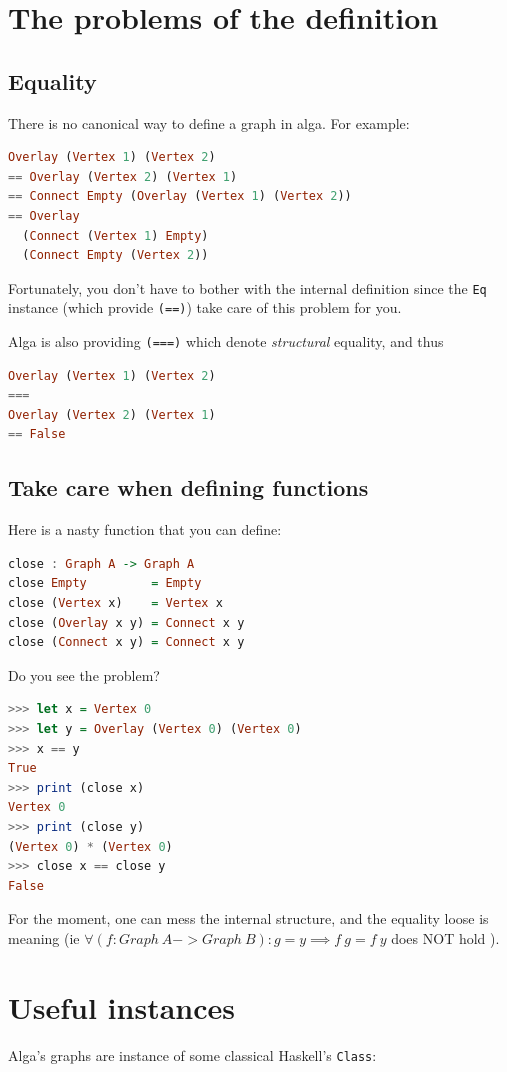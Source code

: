 \documentclass[10pt,a4paper]{article}
\begin{document}
\section{The problems of the definition}
\subsection{Equality}
There is no canonical way to define a graph in alga. For example:
\begin{lstlisting}[language=Haskell, frame=single]
Overlay (Vertex 1) (Vertex 2)
== Overlay (Vertex 2) (Vertex 1)
== Connect Empty (Overlay (Vertex 1) (Vertex 2))
== Overlay 
  (Connect (Vertex 1) Empty)
  (Connect Empty (Vertex 2))
\end{lstlisting}
 
Fortunately, you don't have to bother with the internal definition since the \verb|Eq| instance (which provide \verb|(==)|) take care of this problem for you.

Alga is also providing \verb|(===)| which denote \emph{structural} equality, and thus
 
\begin{lstlisting}[language=Haskell, frame=single]
Overlay (Vertex 1) (Vertex 2)
===
Overlay (Vertex 2) (Vertex 1)
== False
\end{lstlisting}

\subsection{Take care when defining functions}
Here is a nasty function that you can define:
\begin{lstlisting}[language=Haskell, frame=single]
close : Graph A -> Graph A
close Empty         = Empty
close (Vertex x)    = Vertex x
close (Overlay x y) = Connect x y
close (Connect x y) = Connect x y
\end{lstlisting}

Do you see the problem?
\begin{lstlisting}[language=Haskell, frame=single]
>>> let x = Vertex 0
>>> let y = Overlay (Vertex 0) (Vertex 0)
>>> x == y
True
>>> print (close x)
Vertex 0
>>> print (close y)
(Vertex 0) * (Vertex 0)
>>> close x == close y
False
\end{lstlisting}
For the moment, one can mess the internal structure, and the equality loose is meaning (ie $\forall (f: Graph \ A -> Graph \ B) : g = y \implies f \ g = f \ y$ does NOT hold ).
 
\section{Useful instances}
Alga's graphs are instance of some classical Haskell's \verb|Class|:
\end{document}

